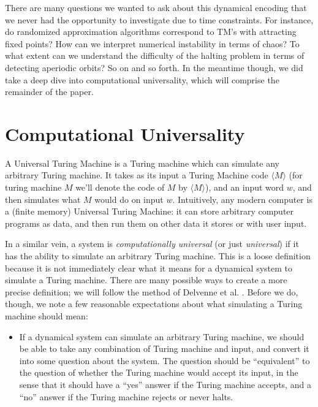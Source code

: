 \documentclass{fkpaper}
\begin{document}
\begin{multicols}{2}
  There are many questions we wanted to ask about this dynamical
  encoding that we never had the opportunity to investigate due to
  time constraints. For instance, do randomized approximation
  algorithms correspond to TM's with attracting fixed points? How can
  we interpret numerical instability in terms of chaos? To what extent
  can we understand the difficulty of the halting problem in terms of
  detecting aperiodic orbits? So on and so forth. In the meantime
  though, we did take a deep dive into computational universality,
  which will comprise the remainder of the paper.





  \section{Computational Universality}

  A Universal Turing Machine is a Turing machine which can simulate any
  arbitrary Turing machine. It takes as its input a Turing Machine code
  $\langle M \rangle$ (for turing machine $M$ we'll denote the code of
  $M$ by $\langle M \rangle$), and an input word $w$, and then simulates
  what $M$ would do on input $w$. Intuitively, any modern computer is a
  (finite memory) Universal Turing Machine: it can store arbitrary
  computer programs as data, and then run them on other data it stores
  or with user input.

  In a similar vein, a system is {\it computationally universal} (or
  just {\it universal}) if it has the ability to simulate an arbitrary
  Turing machine. This is a loose definition because it is not
  immediately clear what it means for a dynamical system to simulate a
  Turing machine. There are many possible ways to create a more precise
  definition; we will follow the method of Delvenne et al.
  \cite{Delvenne2004Apr}. Before we do, though, we note a few reasonable
  expectations about what simulating a Turing machine should mean:

  \begin{itemize}
    \item If a dynamical system can simulate an arbitrary Turing
      machine, we should be able to take any combination of Turing
      machine and input, and convert it into some question about the
      system. The question should be ``equivalent'' to the question of
      whether the Turing machine would accept its input, in the sense
      that it should have a ``yes'' answer if the Turing machine
      accepts, and a ``no'' answer if the Turing machine rejects or
      never halts.


\end{itemize}
\end{multicols}
\end{document}
